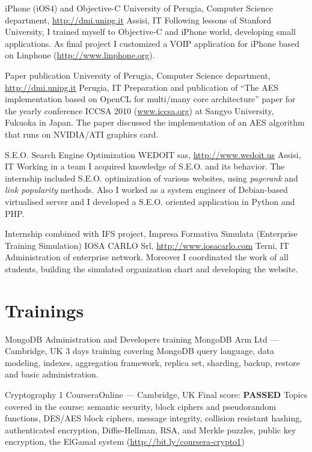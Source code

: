 \documentclass[10pt,a4paper,sans]{moderncv}
\begin{document}
    {iPhone (iOS4) and Objective-C}
    {University of Perugia, Computer Science department,
        \url{http://dmi.unipg.it}}
    {Assisi, IT}{}
    {Following lessons of Stanford University, I trained myself to Objective-C
    and iPhone world, developing small applications. As final project I
    customized a VOIP application for iPhone based on Linphone
    (\url{http://www.linphone.org}).}

    {Paper publication\cite{aes}}
    {University of Perugia, Computer Science department,
        \url{http://dmi.unipg.it}}
    {Perugia, IT}{}
    {Preparation and publication of ``The AES implementation based on OpenCL
    for multi/many core architecture'' paper for the yearly conference ICCSA
    2010 (\url{www.iccsa.org}) at Sangyo University, Fukuoka in Japan. The
    paper discussed the implementation of an AES algorithm that runs on
    NVIDIA/ATI graphics card.}

    {S.E.O. Search Engine Optimization}
    {WEDOIT sas, \url{http://www.wedoit.us}}
    {Assisi, IT}{}
    {Working in a team I acquired knowledge of S.E.O. and its behavior. The
    internship included S.E.O. optimization of various websites, using
    \emph{pagerank} and \emph{link popularity} methods. Also I worked as a
    system engineer of Debian-based virtualised server and I developed a S.E.O.
    oriented application in Python and PHP.}

    {Internship combined with IFS project, Impresa Formativa Simulata
        (Enterprise Training Simulation)}
    {IOSA CARLO Srl, \url{http://www.iosacarlo.com}}
    {Terni, IT}{}
    {Administration of enterprise network. Moreover I coordinated the work of
    all students, building the simulated organization chart and developing the
    website.}

\section{Trainings}
    {MongoDB Administration and Developers training}
    {MongoDB}
    {Arm Ltd --- Cambridge, UK}{}
    {3 days training covering MongoDB query language, data modeling, indexes,
    aggregation framework, replica set, sharding, backup, restore and basic
    administration.}

    {Cryptography 1}
    {Coursera}{Online --- Cambridge, UK}
    {Final score: \textbf{PASSED}}
    {Topics covered in the course: semantic security, block ciphers and
    pseudorandom functions, DES/AES block ciphers, message integrity,
    collision resistant hashing, authenticated encryption, Diffie-Hellman, RSA,
    and Merkle puzzles, public key encryption, the ElGamal system
    (\url{http://bit.ly/coursera-crypto1})}
\end{document}
